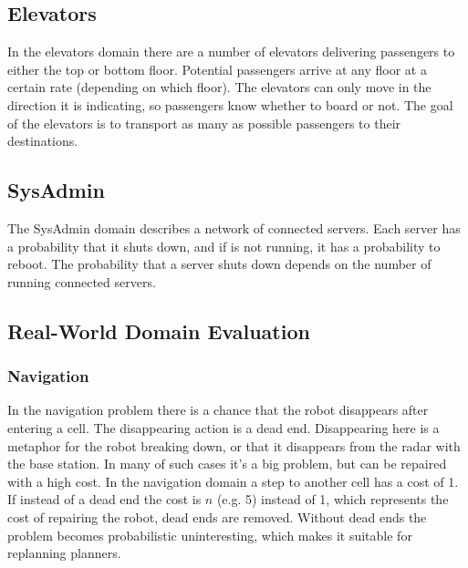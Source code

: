 \documentclass[runningheads,a4paper]{llncs}
\begin{document}

\subsection{Elevators}

In the elevators domain there are a number of elevators delivering passengers
to either the top or bottom floor. Potential passengers arrive at any floor at
a certain rate (depending on which floor). The elevators can only move in the
direction it is indicating, so passengers know whether to board or not. The
goal of the elevators is to transport as many as possible passengers to their
destinations.

\subsection{SysAdmin}

The SysAdmin domain describes a network of connected servers. Each server has
a probability that it shuts down, and if is not running, it has a probability
to reboot. The probability that a server shuts down depends on the number of
running connected servers.

%
%

\subsection{Real-World Domain Evaluation}

\subsubsection{Navigation}

In the navigation problem there is a chance that the robot disappears after
entering a cell. The disappearing action is a dead end. Disappearing here is a
metaphor for the robot breaking down, or that it disappears from the radar with
the base station. In many of such cases it's a big problem, but can be repaired
with a high cost. In the navigation domain a step to another cell has a cost of
1. If instead of a dead end the cost is $n$ (e.g. 5) instead of 1, which
represents the cost of repairing the robot, dead ends are removed. Without dead
ends the problem becomes probabilistic uninteresting, which makes it suitable for
replanning planners.
\end{document}
